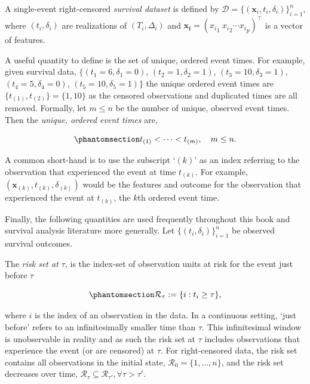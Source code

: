\documentclass[
  letterpaper,
  krantz2]{style/krantz}
\begin{document}
A single-event right-censored \emph{survival
dataset} is defined by
\(\mathcal{D}= \{(\mathbf{x}_i, t_i, \delta_i)\}_{i=1}^n\), where
\((t_i,\delta_i)\) are realizations of \((T_i, \Delta_i)\) and
\(\boldsymbol{\mathbf{x_i}} = ({x_i}_1 \ {x_i}_2 \cdots {x_i}_{p})^\top\)
is a vector of features.

A useful quantity to define is the set of unique, ordered event
times. For example, given survival data,
\(\{(t_1=6, \delta_1=0)\), \((t_2=1, \delta_2=1)\),
\((t_3=10,\delta_3=1)\), \((t_4=5,\delta_4=0)\),
\((t_5 =10,\delta_5=1)\}\) the unique ordered event times are
\(\{t_{(1)},  t_{(2)}\} = \{1,10\}\) as the censored observations and
duplicated times are all removed. Formally, let \(m\leq n\) be the
number of unique, observed event times. Then the \emph{unique, ordered
event times} are,

\begin{equation}\phantomsection\label{eq-unique-ordered-event-times}{
t_{(1)}<\cdots<t_{(m)}, \quad m\le n.
}\end{equation}

A common short-hand is to use the subscript `\((k)\)' as an index
referring to the observation that experienced the event at time
\(t_{(k)}\). For example, \((\mathbf{x}_{(k)}, t_{(k)}, \delta_{(k)})\)
would be the features and outcome for the observation that experienced
the event at \(t_{(k)}\), the \(k\)th ordered event time.

Finally, the following quantities are used frequently throughout this
book and survival analysis literature more generally. Let
\(\{(t_i, \delta_i)\}^n_{i=1}\) be observed survival outcomes.

The \emph{risk set at \(\tau\)}, is the index-set of
observation units at risk for the event just before \(\tau\)

\begin{equation}\phantomsection\label{eq-risk-set}{
\mathcal{R}_\tau := \{i: t_i \geq \tau\},
}\end{equation}

where \(i\) is the index of an observation in the data. In a continuous
setting, `just before' refers to an infinitesimally smaller time than
\(\tau\). This infinitesimal window is unobservable in reality and as
such the risk set at \(\tau\) includes observations that experience the
event (or are censored) at \(\tau\). For right-censored data, the risk
set contains all observations in the initial state,
\(\mathcal{R}_0 = \{1,\ldots,n\}\), and the risk set decreases over
time,
\(\mathcal{R}_{\tau} \subseteq \mathcal{R}_{\tau'}, \forall \tau > \tau'\).
\end{document}
